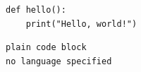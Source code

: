 \begin{listing}[h!]
    \begin{verbatim}
def hello():
    print("Hello, world!")
    \end{verbatim}
\end{listing}

\begin{lstlisting}
plain code block
no language specified
\end{lstlisting}
